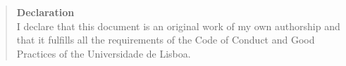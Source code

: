 \begin{quote}
\textbf{Declaration}\\
I declare that this document is an original work of my own authorship
and that it fulfills all the requirements of the Code of Conduct and
Good Practices of the Universidade de Lisboa.
\end{quote}
%
